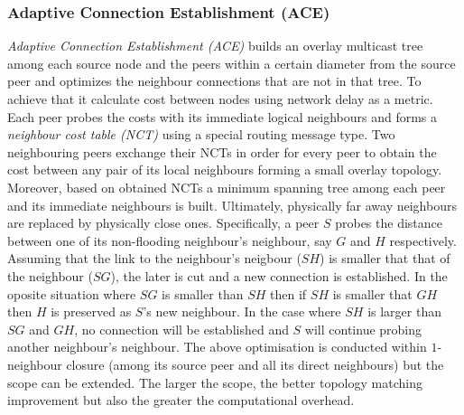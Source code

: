 \subsubsection{Adaptive Connection Establishment (ACE)}
\emph{Adaptive Connection Establishment (ACE)} \cite{liu_ace_2004} builds an
overlay multicast tree among each source node and the peers within a certain
diameter from the source peer and optimizes the neighbour connections that are
not in that tree. To achieve that it calculate cost between nodes using network
delay as a metric. Each peer probes the costs with its immediate logical
neighbours and forms a \emph{neighbour cost table (NCT)} using a special
routing message type. Two neighbouring peers exchange their NCTs in order for
every peer to obtain the cost between any pair of its local neighbours forming a
small overlay topology. Moreover, based on obtained NCTs a minimum spanning tree
among each peer and its immediate neighbours is built. Ultimately, physically
far away neighbours are replaced by physically close ones. Specifically, a peer
$S$ probes the distance between one of its non-flooding neighbour's neighbour,
say $G$ and $H$ respectively. Assuming that the link to the neighbour's neigbour
($SH$) is smaller that that of the neighbour ($SG$), the later is cut and a new
connection is established. In the oposite situation where $SG$ is smaller than
$SH$ then if $SH$ is smaller that $GH$ then $H$ is preserved as $S$'s new
neighbour. In the case where $SH$ is larger than $SG$ and $GH$, no connection
will be established and $S$ will continue probing another neighbour's neighbour.
The above optimisation is conducted within $1$-neighbour closure (among its
source peer and all its direct neighbours) but the scope can be extended. The
larger the scope, the better topology matching improvement but also the greater
the computational overhead.

%
%
%

